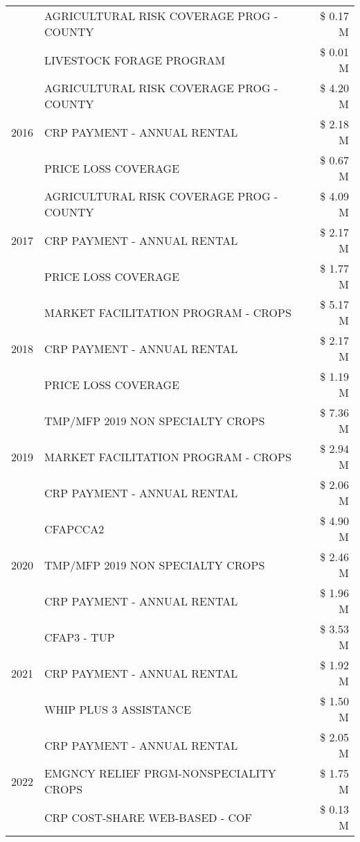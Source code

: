 \begin{tabular}{llr}
 & AGRICULTURAL RISK COVERAGE PROG - COUNTY & \$ 0.17 M \\
 & LIVESTOCK FORAGE PROGRAM & \$ 0.01 M \\
\cline{1-3}
\multirow[t]{3}{*}{2016} & AGRICULTURAL RISK COVERAGE PROG - COUNTY & \$ 4.20 M \\
 & CRP PAYMENT - ANNUAL RENTAL & \$ 2.18 M \\
 & PRICE LOSS COVERAGE & \$ 0.67 M \\
\cline{1-3}
\multirow[t]{3}{*}{2017} & AGRICULTURAL RISK COVERAGE PROG - COUNTY & \$ 4.09 M \\
 & CRP PAYMENT - ANNUAL RENTAL & \$ 2.17 M \\
 & PRICE LOSS COVERAGE & \$ 1.77 M \\
\cline{1-3}
\multirow[t]{3}{*}{2018} & MARKET FACILITATION PROGRAM - CROPS & \$ 5.17 M \\
 & CRP PAYMENT - ANNUAL RENTAL & \$ 2.17 M \\
 & PRICE LOSS COVERAGE & \$ 1.19 M \\
\cline{1-3}
\multirow[t]{3}{*}{2019} & TMP/MFP 2019 NON SPECIALTY CROPS & \$ 7.36 M \\
 & MARKET FACILITATION PROGRAM - CROPS & \$ 2.94 M \\
 & CRP PAYMENT - ANNUAL RENTAL & \$ 2.06 M \\
\cline{1-3}
\multirow[t]{3}{*}{2020} & CFAPCCA2 & \$ 4.90 M \\
 & TMP/MFP 2019 NON SPECIALTY CROPS & \$ 2.46 M \\
 & CRP PAYMENT - ANNUAL RENTAL & \$ 1.96 M \\
\cline{1-3}
\multirow[t]{3}{*}{2021} & CFAP3 - TUP & \$ 3.53 M \\
 & CRP PAYMENT - ANNUAL RENTAL & \$ 1.92 M \\
 & WHIP PLUS 3 ASSISTANCE & \$ 1.50 M \\
\cline{1-3}
\multirow[t]{3}{*}{2022} & CRP PAYMENT - ANNUAL RENTAL & \$ 2.05 M \\
 & EMGNCY RELIEF PRGM-NONSPECIALITY CROPS & \$ 1.75 M \\
 & CRP COST-SHARE WEB-BASED - COF & \$ 0.13 M \\
\cline{1-3}
\bottomrule
\end{tabular}
